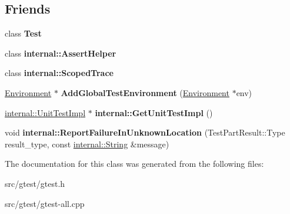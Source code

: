 \subsection*{Friends}
\begin{DoxyCompactItemize}
\item 
\mbox{\label{classtesting_1_1_unit_test_a5b78b1c2e1fa07ffed92da365593eaa4}} 
class {\bfseries Test}
\item 
\mbox{\label{classtesting_1_1_unit_test_a183151aa061362c87572e743fe233db1}} 
class {\bfseries internal\+::\+Assert\+Helper}
\item 
\mbox{\label{classtesting_1_1_unit_test_afa3927576c08d7b1e197ba16b2b3dcb7}} 
class {\bfseries internal\+::\+Scoped\+Trace}
\item 
\mbox{\label{classtesting_1_1_unit_test_a5ec26e4c31220ff8e769cc09689a4d6d}} 
\mbox{\hyperlink{classtesting_1_1_environment}{Environment}} $\ast$ {\bfseries Add\+Global\+Test\+Environment} (\mbox{\hyperlink{classtesting_1_1_environment}{Environment}} $\ast$env)
\item 
\mbox{\label{classtesting_1_1_unit_test_a56e56be7066957d612e53b5c60f6ac08}} 
\mbox{\hyperlink{classtesting_1_1internal_1_1_unit_test_impl}{internal\+::\+Unit\+Test\+Impl}} $\ast$ {\bfseries internal\+::\+Get\+Unit\+Test\+Impl} ()
\item 
\mbox{\label{classtesting_1_1_unit_test_a8aa1029abd3a382c716d1c91fb16fe9c}} 
void {\bfseries internal\+::\+Report\+Failure\+In\+Unknown\+Location} (Test\+Part\+Result\+::\+Type result\+\_\+type, const \mbox{\hyperlink{classtesting_1_1internal_1_1_string}{internal\+::\+String}} \&message)
\end{DoxyCompactItemize}


The documentation for this class was generated from the following files\+:\begin{DoxyCompactItemize}
\item 
src/gtest/gtest.\+h\item 
src/gtest/gtest-\/all.\+cpp\end{DoxyCompactItemize}
